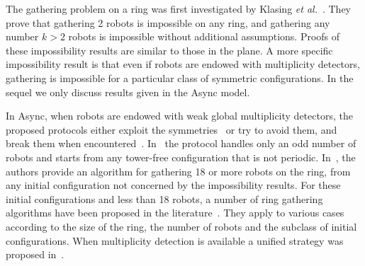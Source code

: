 The gathering problem on a ring was first investigated by Klasing \textit{et al.}~\cite{KlasingMP06}.
They prove that gathering 2 robots is impossible on any ring, and gathering any number $k > 2 $ robots is impossible without additional assumptions. Proofs of these impossibility results are similar to those in the plane.
A more specific impossibility result is that even if robots are endowed with multiplicity detectors, gathering is impossible for a particular 
class of symmetric configurations. In the sequel we only discuss results given in the Async model.

In Async, when robots are endowed with weak global multiplicity detectors, %
the proposed protocols either exploit the symmetries~\cite{klasing_taking_2008} or try to avoid them, and break them when encountered~\cite{KlasingMP06}.
In~\cite{KlasingMP06} the protocol handles only an odd number of robots and starts from any tower-free configuration that is not periodic. 
In~\cite{klasing_taking_2008}, the authors provide an algorithm for gathering 18 or more robots on the ring, from any initial configuration not concerned by the impossibility results.
For these initial configurations and less than 18 robots, a number of ring gathering algorithms have been proposed in the literature~\cite{navarrasirocco2011,navarradisc2012,navarraipdps2013,navarrasirocco2013}. They apply to various cases according to 
the size of the ring, the number of robots and the subclass of initial configurations. When multiplicity detection is available a unified 
strategy was proposed in~\cite{navarradisc2012}. 


